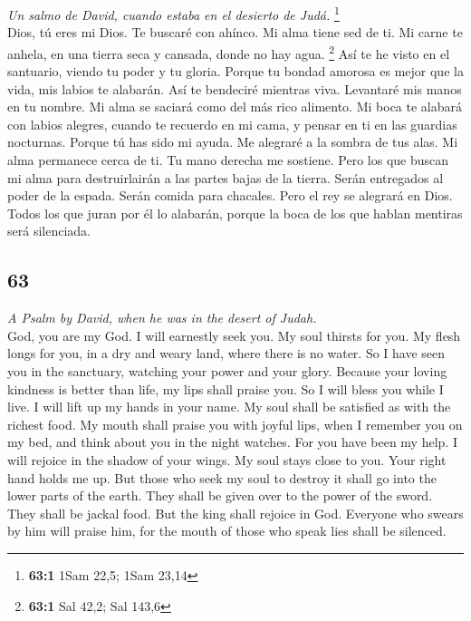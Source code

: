 \begin{paracol}{2}
\emph{Un salmo de David, cuando estaba en el desierto de Judá.}
\footnote{\textbf{63:1} 1Sam 22,5; 1Sam 23,14}\\
 Dios, tú eres mi Dios. Te buscaré con ahínco. Mi alma
tiene sed de ti. Mi carne te anhela, en una tierra seca y cansada, donde
no hay agua. \footnote{\textbf{63:1} Sal 42,2; Sal 143,6} 
Así te he visto en el santuario, viendo tu poder y tu gloria.
 Porque tu bondad amorosa es mejor que la vida, mis labios
te alabarán.  Así te bendeciré mientras viva. Levantaré
mis manos en tu nombre.  Mi alma se saciará como del más
rico alimento. Mi boca te alabará con labios alegres, 
cuando te recuerdo en mi cama, y pensar en ti en las guardias nocturnas.
 Porque tú has sido mi ayuda. Me alegraré a la sombra de
tus alas.  Mi alma permanece cerca de ti. Tu mano derecha
me sostiene.  Pero los que buscan mi alma para
destruirlairán a las partes bajas de la tierra.  Serán
entregados al poder de la espada. Serán comida para chacales.
 Pero el rey se alegrará en Dios. Todos los que juran por
él lo alabarán, porque la boca de los que hablan mentiras será
silenciada.

\switchcolumn
\begin{otherlanguage}{english}

\hypertarget{section-125}{%
\section{63}\label{section-125}}

\emph{A Psalm by David, when he was in the desert of Judah.}\\
 God, you are my God. I will earnestly seek you. My soul
thirsts for you. My flesh longs for you, in a dry and weary land, where
there is no water.  So I have seen you in the sanctuary,
watching your power and your glory.  Because your loving
kindness is better than life, my lips shall praise you. 
So I will bless you while I live. I will lift up my hands in your name.
 My soul shall be satisfied as with the richest food. My
mouth shall praise you with joyful lips,  when I remember
you on my bed, and think about you in the night watches. 
For you have been my help. I will rejoice in the shadow of your wings.
 My soul stays close to you. Your right hand holds me up.
 But those who seek my soul to destroy it shall go into
the lower parts of the earth.  They shall be given over
to the power of the sword. They shall be jackal food. 
But the king shall rejoice in God. Everyone who swears by him will
praise him, for the mouth of those who speak lies shall be silenced.


\end{otherlanguage}
\end{paracol}
